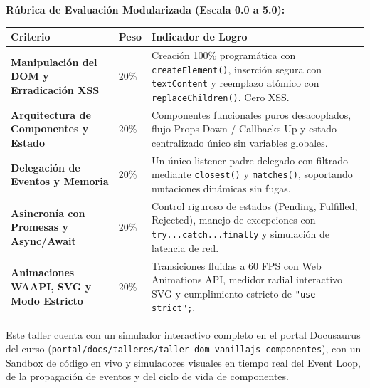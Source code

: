\documentclass[10pt,letterpaper]{article}
\begin{document}
\noindent
\textbf{Rúbrica de Evaluación Modularizada (Escala 0.0 a 5.0):}
\begin{center}
\small
\begin{tabularx}{\textwidth}{L{3.4cm}C{1.3cm}X}
\toprule
\textbf{Criterio} & \textbf{Peso} & \textbf{Indicador de Logro} \\
\midrule
\textbf{Manipulación del DOM y Erradicación XSS} & 20\% & Creación 100\% programática con \texttt{createElement()}, inserción segura con \texttt{textContent} y reemplazo atómico con \texttt{replaceChildren()}. Cero XSS. \\
\textbf{Arquitectura de Componentes y Estado} & 20\% & Componentes funcionales puros desacoplados, flujo Props Down / Callbacks Up y estado centralizado único sin variables globales. \\
\textbf{Delegación de Eventos y Memoria} & 20\% & Un único listener padre delegado con filtrado mediante \texttt{closest()} y \texttt{matches()}, soportando mutaciones dinámicas sin fugas. \\
\textbf{Asincronía con Promesas y Async/Await} & 20\% & Control riguroso de estados (Pending, Fulfilled, Rejected), manejo de excepciones con \texttt{try...catch...finally} y simulación de latencia de red. \\
\textbf{Animaciones WAAPI, SVG y Modo Estricto} & 20\% & Transiciones fluidas a 60 FPS con Web Animations API, medidor radial interactivo SVG y cumplimiento estricto de \texttt{"use strict";}. \\
\bottomrule
\end{tabularx}
\end{center}

\vspace{0.10cm}
\begin{tcolorbox}[colback=icesiGreen!10,colframe=icesiGreen,arc=3pt,title=\textbf{Portal Interactivo de Aprendizaje Web}]
\fontsize{7.5}{9.5}\selectfont
Este taller cuenta con un simulador interactivo completo en el portal Docusaurus del curso (\texttt{portal/docs/talleres/taller-dom-vanillajs-componentes}), con un Sandbox de código en vivo y simuladores visuales en tiempo real del Event Loop, de la propagación de eventos y del ciclo de vida de componentes.
\end{tcolorbox}
\end{document}
